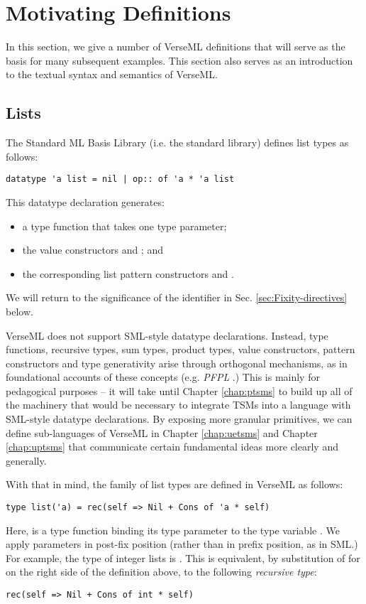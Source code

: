 \section{Motivating Definitions}\label{sec:motivating-examples}
In this section, we give a number of VerseML definitions that will serve as the basis for many subsequent examples. This section also serves as an introduction to the textual syntax and semantics of VerseML.

\subsection{Lists}\label{sec:lists}
The Standard ML Basis Library (i.e.  the standard library) defines list types as follows:
\begin{lstlisting}[numbers=none]
datatype 'a list = nil | op:: of 'a * 'a list
\end{lstlisting}
This datatype declaration generates:
\begin{itemize}
\item a type function  that takes one type parameter; 
\item the value constructors  and ; and
\item the corresponding list pattern constructors  and .
\end{itemize}
We will return to the significance of the identifier  in Sec. \ref{sec:Fixity-directives} below.

VerseML does not support SML-style datatype declarations. Instead, type functions, recursive types, sum types, product types, value constructors, pattern constructors and type generativity arise through orthogonal mechanisms, as in foundational accounts of these concepts (e.g. \emph{PFPL} \cite{pfpl}.) This is mainly for pedagogical purposes -- it will take until Chapter \ref{chap:ptsms} to build up all of the machinery that would be necessary to integrate TSMs into a language with SML-style datatype declarations. By exposing more granular primitives, we can define sub-languages of VerseML in Chapter \ref{chap:uetsms} and Chapter \ref{chap:uptsms} that communicate certain fundamental ideas more clearly and generally.

With that in mind, the family of list types are defined in VerseML as follows:
\begin{lstlisting}[numbers=none]
type list('a) = rec(self => Nil + Cons of 'a * self)
\end{lstlisting}
Here,  is a {type function} binding its type parameter to the type variable . We apply parameters in post-fix position (rather than in prefix position, as in SML.) For example, the type of integer lists is . This is equivalent, by substitution of  for  on the right side of the definition above, to the following \emph{recursive type}:
\begin{lstlisting}[numbers=none]
rec(self => Nil + Cons of int * self)
\end{lstlisting}

